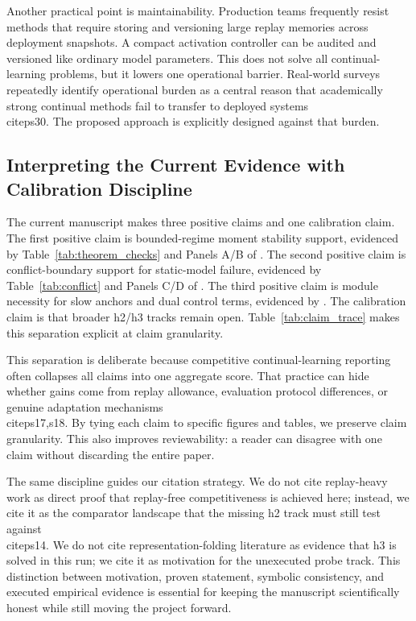 \documentclass{article} %
\begin{document}
Another practical point is maintainability. Production teams frequently resist methods that require storing and versioning large replay memories across deployment snapshots. A compact activation controller can be audited and versioned like ordinary model parameters. This does not solve all continual-learning problems, but it lowers one operational barrier. Real-world surveys repeatedly identify operational burden as a central reason that academically strong continual methods fail to transfer to deployed systems \\citep{s30}. The proposed approach is explicitly designed against that burden.

\subsection{Interpreting the Current Evidence with Calibration Discipline}
The current manuscript makes three positive claims and one calibration claim. The first positive claim is bounded-regime moment stability support, evidenced by Table~\ref{tab:theorem_checks} and Panels A/B of . The second positive claim is conflict-boundary support for static-model failure, evidenced by Table~\ref{tab:conflict} and Panels C/D of . The third positive claim is module necessity for slow anchors and dual control terms, evidenced by . The calibration claim is that broader h2/h3 tracks remain open. Table~\ref{tab:claim_trace} makes this separation explicit at claim granularity.

This separation is deliberate because competitive continual-learning reporting often collapses all claims into one aggregate score. That practice can hide whether gains come from replay allowance, evaluation protocol differences, or genuine adaptation mechanisms \\citep{s17,s18}. By tying each claim to specific figures and tables, we preserve claim granularity. This also improves reviewability: a reader can disagree with one claim without discarding the entire paper.

The same discipline guides our citation strategy. We do not cite replay-heavy work as direct proof that replay-free competitiveness is achieved here; instead, we cite it as the comparator landscape that the missing h2 track must still test against \\citep{s14}. We do not cite representation-folding literature as evidence that h3 is solved in this run; we cite it as motivation for the unexecuted probe track. This distinction between motivation, proven statement, symbolic consistency, and executed empirical evidence is essential for keeping the manuscript scientifically honest while still moving the project forward.
\end{document}
